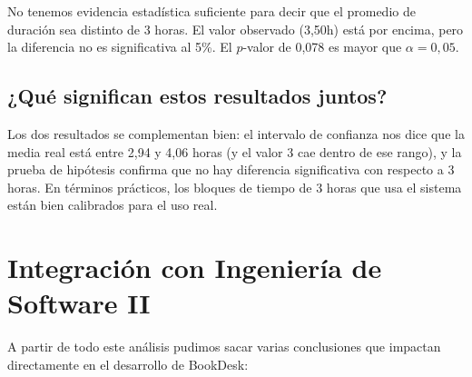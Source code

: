\documentclass[12pt,a4paper]{article}
\begin{document}
No tenemos evidencia estadística suficiente para decir que el promedio de duración sea distinto de 3 horas. El valor observado (3,50h) está por encima, pero la diferencia no es significativa al 5\%. El $p$-valor de 0,078 es mayor que $\alpha = 0{,}05$.

\subsection{¿Qué significan estos resultados juntos?}

Los dos resultados se complementan bien: el intervalo de confianza nos dice que la media real está entre 2,94 y 4,06 horas (y el valor 3 cae dentro de ese rango), y la prueba de hipótesis confirma que no hay diferencia significativa con respecto a 3 horas. En términos prácticos, los bloques de tiempo de 3 horas que usa el sistema están bien calibrados para el uso real.

\section{Integración con Ingeniería de Software II}

A partir de todo este análisis pudimos sacar varias conclusiones que impactan directamente en el desarrollo de BookDesk:
\end{document}
